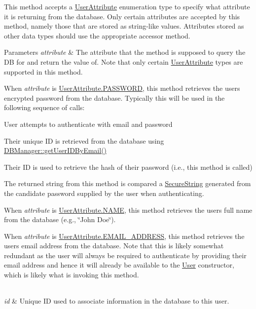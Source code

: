 This method accepts a \mbox{\hyperlink{enumcom_1_1activitytracker_1_1_user_attribute}{User\+Attribute}} enumeration type to specify what attribute it is returning from the database. Only certain attributes are accepted by this method, namely those that are stored as string-\/like values. Attributes stored as other data types should use the appropriate accessor method.


\begin{DoxyParams}{Parameters}
{\em attribute} & The attribute that the method is supposed to query the DB for and return the value of. Note that only certain \mbox{\hyperlink{enumcom_1_1activitytracker_1_1_user_attribute}{User\+Attribute}} types are supported in this method.
\begin{DoxyItemize}
\item When {\itshape attribute} is \mbox{\hyperlink{enumcom_1_1activitytracker_1_1_user_attribute_aa893eac0362a28e73a599ce1ba141d40}{User\+Attribute.\+P\+A\+S\+S\+W\+O\+RD}}, this method retrieves the user\textquotesingle{}s encrypted password from the database. Typically this will be used in the following sequence of calls\+:
\begin{DoxyEnumerate}
\item User attempts to authenticate with email and password
\item Their unique ID is retrieved from the database using \mbox{\hyperlink{classcom_1_1activitytracker_1_1_d_b_manager_a195dcdeabdd00facb19d720976dd3f53}{D\+B\+Manager\+::get\+User\+I\+D\+By\+Email()}}
\item Their ID is used to retrieve the hash of their password (i.\+e., this method is called)
\item The returned string from this method is compared a \mbox{\hyperlink{classcom_1_1activitytracker_1_1_secure_string}{Secure\+String}} generated from the candidate password supplied by the user when authenticating.
\end{DoxyEnumerate}
\item When {\itshape attribute} is \mbox{\hyperlink{enumcom_1_1activitytracker_1_1_user_attribute_aac51a5dfcaaa9e5304d37d74fc888af4}{User\+Attribute.\+N\+A\+ME}}, this method retrieves the user\textquotesingle{}s full name from the database (e.\+g., \char`\"{}\+John Doe\char`\"{}).
\item When {\itshape attribute} is \mbox{\hyperlink{enumcom_1_1activitytracker_1_1_user_attribute_a8b9fa2ebf911262dfa24c683ff2a3b9c}{User\+Attribute.\+E\+M\+A\+I\+L\+\_\+\+A\+D\+D\+R\+E\+SS}}, this method retrieves the user\textquotesingle{}s email address from the database. Note that this is likely somewhat redundant as the user will always be required to authenticate by providing their email address and hence it will already be available to the \mbox{\hyperlink{classcom_1_1activitytracker_1_1_user}{User}} constructor, which is likely what is invoking this method. 
\end{DoxyItemize}\\
\hline
{\em id} & Unique ID used to associate information in the database to this user.\\
\hline
\end{DoxyParams}
